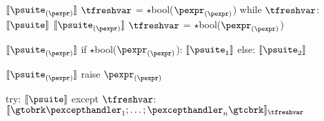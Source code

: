 \documentclass{article}
\begin{document}
\begin{mathpar}
\end{mathpar}

\newsavebox{\whileBox}
\begin{lrbox}{\whileBox}
\begin{python}
$\meaningof{\psuite_{(\pexpr)}}$
$\tfreshvar$ = $\star$bool($\pexpr_{(\pexpr)}$)
while $\tfreshvar$:
  $\meaningof{\psuite}$
  $\meaningof{\psuite_{(\pexpr)}}$
  $\tfreshvar$ = $\star$bool($\pexpr_{(\pexpr)}$)
\end{python}
\end{lrbox}

\begin{mathpar}
\end{mathpar}

\newsavebox{\ifBox}
\begin{lrbox}{\ifBox}
\begin{python}
$\meaningof{\psuite_{(\pexpr)}}$
if $\star$bool($\pexpr_{(\pexpr)}$):
  $\meaningof{\psuite_1}$
else:
  $\meaningof{\psuite_2}$
\end{python}
\end{lrbox}

\begin{mathpar}
\end{mathpar}

\newsavebox{\raiseBox}
\begin{lrbox}{\raiseBox}
\begin{python}
$\meaningof{\psuite_{(\pexpr)}}$
raise $\pexpr_{(\pexpr)}$
\end{python}
\end{lrbox}

\begin{mathpar}
\end{mathpar}

\newsavebox{\tryBox}
\begin{lrbox}{\tryBox}
\begin{python}
try:
  $\meaningof{\psuite}$
except $\tfreshvar$:
  $\meaningof{\gtobrk \pexcepthandler_1; \ldots; \pexcepthandler_n \gtcbrk}_{\tfreshvar}$
\end{python}
\end{lrbox}
\end{document}
